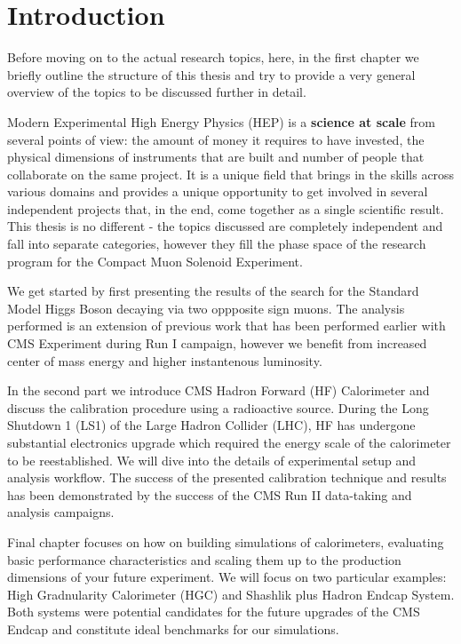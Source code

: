 \chapter{Introduction} \label{chapter:introduction}
Before moving on to the actual research topics, here, in the first chapter we briefly outline the structure of this thesis and try to provide a very general overview of the topics to be discussed further in detail.

Modern Experimental High Energy Physics (HEP) is a \textbf{science at scale} from several points of view: the amount of money it requires to have invested, the physical dimensions of instruments that are built and number of people that collaborate on the same project. It is a unique field that brings in the skills across various domains and provides a unique opportunity to get involved in several independent projects that, in the end, come together as a single scientific result. This thesis is no different - the topics discussed are completely independent and fall into separate categories, however they fill the phase space of the research program for the Compact Muon Solenoid Experiment.

We get started by first presenting the results of the search for the Standard Model Higgs Boson decaying via two oppposite sign muons. The analysis performed is an extension of previous work that has been performed earlier with CMS Experiment during Run I campaign, however we benefit from increased center of mass energy and higher instantenous luminosity.

In the second part we introduce CMS Hadron Forward (HF) Calorimeter and discuss the calibration procedure using a radioactive source. During the Long Shutdown 1 (LS1) of the Large Hadron Collider (LHC), HF has undergone substantial electronics upgrade which required the energy scale of the calorimeter to be reestablished. We will dive into the details of experimental setup and analysis workflow. The success of the presented calibration technique and results has been demonstrated by the success of the CMS Run II data-taking and analysis campaigns.

Final chapter focuses on how on building simulations of calorimeters, evaluating basic performance characteristics and scaling them up to the production dimensions of your future experiment. We will focus on two particular examples: High Gradnularity Calorimeter (HGC) and Shashlik plus Hadron Endcap System. Both systems were potential candidates for the future upgrades of the CMS Endcap and constitute ideal benchmarks for our simulations.

